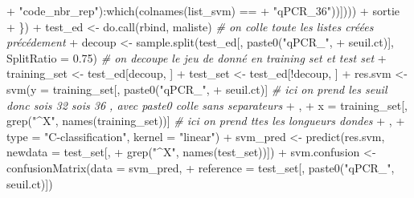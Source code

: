 \documentclass[
  11pt,
  french,
  a4paper,
  extrafontsizes,onecolumn,openright
  ]{memoir}
\newenvironment{Shaded}{\begin{snugshade}}{\end{snugshade}}
\newcommand{\AttributeTok}[1]{\textcolor[rgb]{0.77,0.63,0.00}{#1}}
\newcommand{\CommentTok}[1]{\textcolor[rgb]{0.56,0.35,0.01}{\textit{#1}}}
\newcommand{\FloatTok}[1]{\textcolor[rgb]{0.00,0.00,0.81}{#1}}
\newcommand{\FunctionTok}[1]{\textcolor[rgb]{0.00,0.00,0.00}{#1}}
\newcommand{\NormalTok}[1]{#1}
\newcommand{\OtherTok}[1]{\textcolor[rgb]{0.56,0.35,0.01}{#1}}
\newcommand{\SpecialCharTok}[1]{\textcolor[rgb]{0.00,0.00,0.00}{#1}}
\newcommand{\StringTok}[1]{\textcolor[rgb]{0.31,0.60,0.02}{#1}}
\begin{document}
\begin{Shaded}
\begin{Highlighting}[]
\SpecialCharTok{+}                 \StringTok{"code\_nbr\_rep"}\NormalTok{)}\SpecialCharTok{:}\FunctionTok{which}\NormalTok{(}\FunctionTok{colnames}\NormalTok{(list\_svm) }\SpecialCharTok{==} 
\SpecialCharTok{+}                 \StringTok{"qPCR\_36"}\NormalTok{))])))}
\SpecialCharTok{+}\NormalTok{         sortie}
\SpecialCharTok{+}\NormalTok{     \})}
\SpecialCharTok{+}\NormalTok{     test\_ed }\OtherTok{\textless{}{-}} \FunctionTok{do.call}\NormalTok{(rbind, maliste)  }\CommentTok{\# on colle toute les listes créées précédement }
\SpecialCharTok{+}\NormalTok{     decoup }\OtherTok{\textless{}{-}} \FunctionTok{sample.split}\NormalTok{(test\_ed[, }\FunctionTok{paste0}\NormalTok{(}\StringTok{"qPCR\_"}\NormalTok{, }
\SpecialCharTok{+}\NormalTok{         seuil.ct)], }\AttributeTok{SplitRatio =} \FloatTok{0.75}\NormalTok{)  }\CommentTok{\# on decoupe le jeu de donné en training set et test set}
\SpecialCharTok{+}\NormalTok{     training\_set }\OtherTok{\textless{}{-}}\NormalTok{ test\_ed[decoup, ]}
\SpecialCharTok{+}\NormalTok{     test\_set }\OtherTok{\textless{}{-}}\NormalTok{ test\_ed[}\SpecialCharTok{!}\NormalTok{decoup, ]}
\SpecialCharTok{+}\NormalTok{     res.svm }\OtherTok{\textless{}{-}} \FunctionTok{svm}\NormalTok{(}\AttributeTok{y =}\NormalTok{ training\_set[, }\FunctionTok{paste0}\NormalTok{(}\StringTok{"qPCR\_"}\NormalTok{, }
\SpecialCharTok{+}\NormalTok{         seuil.ct)]  }\CommentTok{\# ici on prend les seuil donc sois 32 sois 36 , avec \textquotesingle{}paste0\textquotesingle{} colle sans separateurs}
\SpecialCharTok{+}\NormalTok{ , }
\SpecialCharTok{+}         \AttributeTok{x =}\NormalTok{ training\_set[, }\FunctionTok{grep}\NormalTok{(}\StringTok{"\^{}X"}\NormalTok{, }\FunctionTok{names}\NormalTok{(training\_set))]  }\CommentTok{\# ici on prend ttes les longueurs d\textquotesingle{}ondes}
\SpecialCharTok{+}\NormalTok{ , }
\SpecialCharTok{+}         \AttributeTok{type =} \StringTok{"C{-}classification"}\NormalTok{, }\AttributeTok{kernel =} \StringTok{"linear"}\NormalTok{)}
\SpecialCharTok{+}\NormalTok{     svm\_pred }\OtherTok{\textless{}{-}} \FunctionTok{predict}\NormalTok{(res.svm, }\AttributeTok{newdata =}\NormalTok{ test\_set[, }
\SpecialCharTok{+}         \FunctionTok{grep}\NormalTok{(}\StringTok{"\^{}X"}\NormalTok{, }\FunctionTok{names}\NormalTok{(test\_set))])}
\SpecialCharTok{+}\NormalTok{     svm.confusion }\OtherTok{\textless{}{-}} \FunctionTok{confusionMatrix}\NormalTok{(}\AttributeTok{data =}\NormalTok{ svm\_pred, }
\SpecialCharTok{+}         \AttributeTok{reference =}\NormalTok{ test\_set[, }\FunctionTok{paste0}\NormalTok{(}\StringTok{"qPCR\_"}\NormalTok{, seuil.ct)])}

\end{Highlighting}
\end{Shaded}
\end{document}
